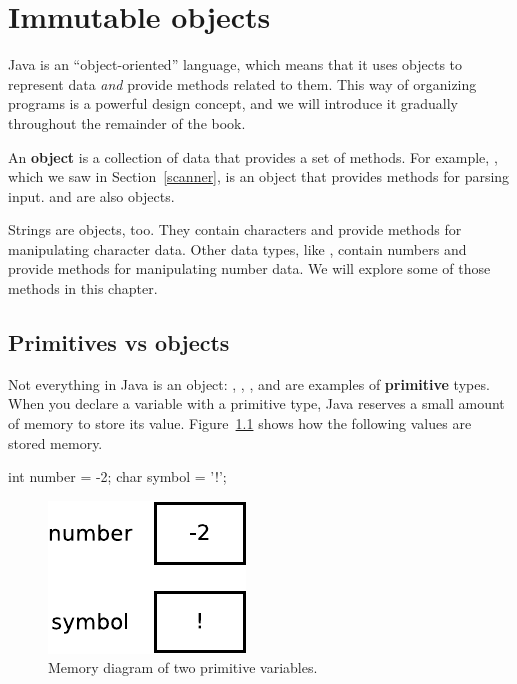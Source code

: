 \chapter{Immutable objects}
\label{immutable}


Java is an ``object-oriented'' language, which means that it uses objects to represent data {\em and} provide methods related to them.
This way of organizing programs is a powerful design concept, and we will introduce it gradually throughout the remainder of the book.


An {\bf object} is a collection of data that provides a set of methods.
For example, , which we saw in Section~\ref{scanner}, is an object that provides methods for parsing input.
 and  are also objects.

Strings are objects, too.
They contain characters and provide methods for manipulating character data.
Other data types, like , contain numbers and provide methods for manipulating number data.
We will explore some of those methods in this chapter.


\section{Primitives vs objects}


Not everything in Java is an object: , , , and  are examples of {\bf primitive} types.
When you declare a variable with a primitive type, Java reserves a small amount of memory to store its value.
Figure~\ref{fig.mem1} shows how the following values are stored memory.

\begin{code}
int number = -2;
char symbol = '!';
\end{code}

\begin{figure}[!ht]
\begin{center}
\includegraphics[scale=0.85]{figs/mem1.pdf}
\caption{Memory diagram of two primitive variables.}
\label{fig.mem1}
\end{center}
\end{figure}

